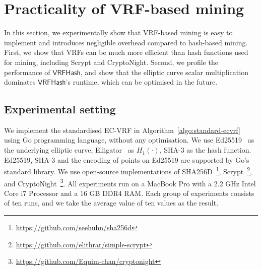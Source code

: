 \section{Practicality of VRF-based mining}
\label{sec:practicality}

In this section, we experimentally show that VRF-based mining is easy to implement and introduces negligible overhead compared to hash-based mining.
First, we show that VRFs can be much more efficient than hash functions used for mining, including Scrypt and CryptoNight.
Second, we profile the performance of $\mathsf{VRFHash}$, and show that the elliptic curve scalar multiplication dominates $\mathsf{VRFHash}$'s runtime, which can be optimised in the future.

\subsection{Experimental setting}

We implement the standardised EC-VRF in Algorithm~\ref{algo:standard-ecvrf} using Go programming language, without any optimisation.
We use Ed25519~\cite{bernstein2012high} as the underlying elliptic curve, Elligator~\cite{bernstein2013elligator} as $H_1(\cdot)$, SHA-3 as the hash function.
Ed25519, SHA-3 and the encoding of points on Ed25519 are supported by Go's standard library.
We use open-source implementations of SHA256D~\footnote{\url{https://github.com/seehuhn/sha256d}}, Scrypt~\footnote{\url{https://github.com/elithrar/simple-scrypt}}, and CryptoNight~\footnote{\url{https://github.com/Equim-chan/cryptonight}}.
All experiments run on a MacBook Pro with a 2.2 GHz Intel Core i7 Processor and a 16 GB DDR4 RAM.
Each group of experiments consists of ten runs, and we take the average value of ten values as the result.


